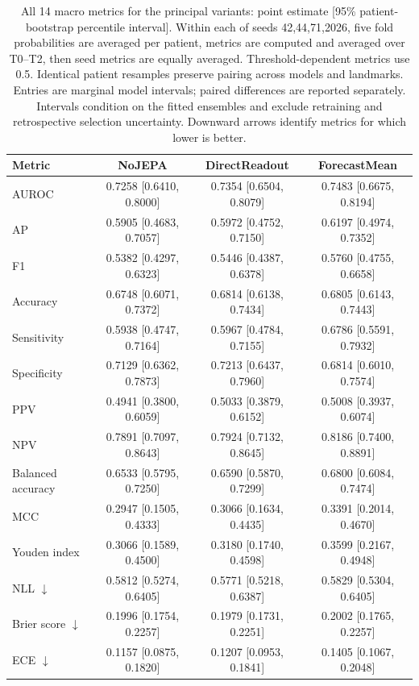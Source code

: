 \begin{table}[t]
\centering
\footnotesize
\setlength{\tabcolsep}{5pt}
\caption{All 14 macro metrics for the principal variants: point estimate [95\% patient-bootstrap percentile interval]. Within each of seeds 42,44,71,2026, five fold probabilities are averaged per patient, metrics are computed and averaged over T0--T2, then seed metrics are equally averaged. Threshold-dependent metrics use 0.5. Identical patient resamples preserve pairing across models and landmarks. Entries are marginal model intervals; paired differences are reported separately. Intervals condition on the fitted ensembles and exclude retraining and retrospective selection uncertainty. Downward arrows identify metrics for which lower is better.}
\label{tab:extended_macro}
\begin{tabular}{lccc}
\toprule
Metric & NoJEPA & DirectReadout & ForecastMean \\
\midrule
AUROC & 0.7258 [0.6410, 0.8000] & 0.7354 [0.6504, 0.8079] & 0.7483 [0.6675, 0.8194] \\
AP & 0.5905 [0.4683, 0.7057] & 0.5972 [0.4752, 0.7150] & 0.6197 [0.4974, 0.7352] \\
F1 & 0.5382 [0.4297, 0.6323] & 0.5446 [0.4387, 0.6378] & 0.5760 [0.4755, 0.6658] \\
Accuracy & 0.6748 [0.6071, 0.7372] & 0.6814 [0.6138, 0.7434] & 0.6805 [0.6143, 0.7443] \\
Sensitivity & 0.5938 [0.4747, 0.7164] & 0.5967 [0.4784, 0.7155] & 0.6786 [0.5591, 0.7932] \\
Specificity & 0.7129 [0.6362, 0.7873] & 0.7213 [0.6437, 0.7960] & 0.6814 [0.6010, 0.7574] \\
PPV & 0.4941 [0.3800, 0.6059] & 0.5033 [0.3879, 0.6152] & 0.5008 [0.3937, 0.6074] \\
NPV & 0.7891 [0.7097, 0.8643] & 0.7924 [0.7132, 0.8645] & 0.8186 [0.7400, 0.8891] \\
Balanced accuracy & 0.6533 [0.5795, 0.7250] & 0.6590 [0.5870, 0.7299] & 0.6800 [0.6084, 0.7474] \\
MCC & 0.2947 [0.1505, 0.4333] & 0.3066 [0.1634, 0.4435] & 0.3391 [0.2014, 0.4670] \\
Youden index & 0.3066 [0.1589, 0.4500] & 0.3180 [0.1740, 0.4598] & 0.3599 [0.2167, 0.4948] \\
NLL $\downarrow$ & 0.5812 [0.5274, 0.6405] & 0.5771 [0.5218, 0.6387] & 0.5829 [0.5304, 0.6405] \\
Brier score $\downarrow$ & 0.1996 [0.1754, 0.2257] & 0.1979 [0.1731, 0.2251] & 0.2002 [0.1765, 0.2257] \\
ECE $\downarrow$ & 0.1157 [0.0875, 0.1820] & 0.1207 [0.0953, 0.1841] & 0.1405 [0.1067, 0.2048] \\
\bottomrule
\end{tabular}
\end{table}
